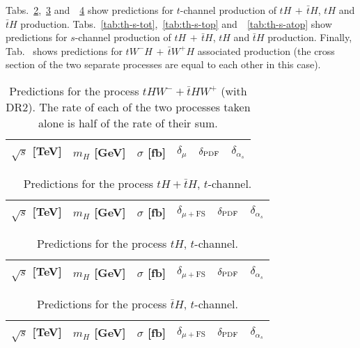 Tabs.~\ref{tab:th-t-tot},~\ref{tab:th-t-top} and~~\ref{tab:th-t-atop}
show predictions for $t$-channel production of $tH\,+\,\bar tH$, $tH$ and $\bar tH$ production. Tabs.~\ref{tab:th-s-tot},~\ref{tab:th-s-top} and~~\ref{tab:th-s-atop}
show predictions for $s$-channel production of $tH\,+\,\bar tH$, $tH$ and $\bar tH$ production. Finally, Tab.~\label{tab:thw-tot}
shows predictions for $tW^-H \,+ \,\bar t W^+H$ associated production (the cross section of the two separate processes are equal to each other in this case).


\begin{table}
    \centering
    \begin{tabular}{cccccc}
        $\sqrt{s}$ [TeV]  &  $m_H$ [GeV]  &  $\sigma$ [fb]  & $\delta_{\mu}$   &  $\delta_{\rm PDF}$   & $\delta_{\alpha_s}$\\
        \hline
          
    \end{tabular}
    \caption{\label{tab:thw-tot} Predictions for the process $tHW^- + \bar t HW^+$ (with DR2). The rate of each of the two processes taken alone is
half of the rate of their sum.}
\end{table}

\begin{table}
    \centering
    \begin{tabular}{cccccc}
        $\sqrt{s}$ [TeV]  &  $m_H$ [GeV]  &  $\sigma$ [fb]  & $\delta_{\mu+\textrm{FS}}$   &  $\delta_{\rm PDF}$   & $\delta_{\alpha_s}$\\
        \hline
          
    \end{tabular}
    \caption{\label{tab:th-t-tot} Predictions for the process $tH + \bar t H$, $t$-channel.}
\end{table}
%
\begin{table}
    \centering
    \begin{tabular}{cccccc}
        $\sqrt{s}$ [TeV]  &  $m_H$ [GeV]  &  $\sigma$ [fb]  & $\delta_{\mu+\textrm{FS}}$   &  $\delta_{\rm PDF}$   & $\delta_{\alpha_s}$\\
        \hline
          
    \end{tabular}
    \caption{\label{tab:th-t-top} Predictions for the process $tH$, $t$-channel.}
\end{table}
%
\begin{table}
    \centering
    \begin{tabular}{cccccc}
        $\sqrt{s}$ [TeV]  &  $m_H$ [GeV]  &  $\sigma$ [fb]  & $\delta_{\mu+\textrm{FS}}$   &  $\delta_{\rm PDF}$   & $\delta_{\alpha_s}$\\
        \hline
          
    \end{tabular}
    \caption{\label{tab:th-t-atop} Predictions for the process $\bar tH$, $t$-channel.}
\end{table}

